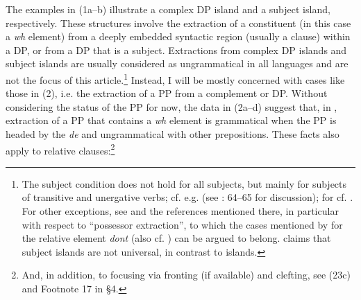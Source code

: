 \documentclass[output=paper]{langsci/langscibook}
\begin{document}
\ea%
    \label{ex:mensch:2}
    \z
\z

The examples in (1a–b) illustrate a complex DP island and a subject island, respectively. These structures involve the extraction of a constituent (in this case a \textit{wh} element) from a deeply embedded syntactic region (usually a clause) within a DP, or from a DP that is a subject. Extractions from complex DP islands and subject islands are usually considered as ungrammatical in all languages and are not the focus of this article.\footnote{The subject condition does not hold for all subjects, but mainly for subjects of transitive and unergative verbs; cf. e.g. \citet[153–154]{Chomsky2008} (see \citealt{Broekhuis2005}: 64–65 for discussion); for  cf. \citet[90]{Tellier1991}. For other exceptions, see \citet{Truswell2005} and the references mentioned there, in particular with respect to “possessor extraction”, to which the  cases mentioned by \citet{Tellier1990} for the relative element \textit{dont} (also cf. \citealt{Heck2008,Heck2009}) can be argued to belong. \citet{Stepanov2007} claims that subject islands are not universal, in contrast to  islands.} Instead, I will be mostly concerned with cases like those in (2), i.e. the extraction of a PP from a complement or  DP. Without considering the status of the PP for now, the data in (2a–d) suggest that, in , extraction of a PP that contains a \textit{wh} element is grammatical when the PP is headed by the  \textit{de} and ungrammatical with other prepositions. These facts also apply to relative clauses:\footnote{And, in addition, to focusing via fronting (if available) and clefting, see (23c) and Footnote 17 in §4.}
\end{document}
